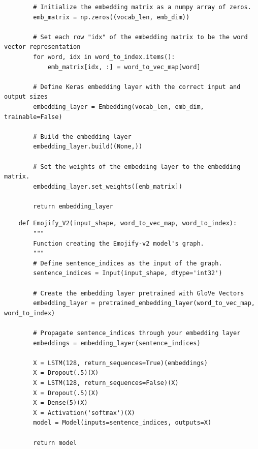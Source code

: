 \documentclass[11pt, a4paper]{article}
\begin{document}
\begin{spacing}{1.1}
\begin{lstlisting}
		# Initialize the embedding matrix as a numpy array of zeros.
		emb_matrix = np.zeros((vocab_len, emb_dim))
		
		# Set each row "idx" of the embedding matrix to be the word vector representation
		for word, idx in word_to_index.items():
			emb_matrix[idx, :] = word_to_vec_map[word]
		
		# Define Keras embedding layer with the correct input and output sizes
		embedding_layer = Embedding(vocab_len, emb_dim, trainable=False)
		
		# Build the embedding layer
		embedding_layer.build((None,))
		
		# Set the weights of the embedding layer to the embedding matrix.
		embedding_layer.set_weights([emb_matrix])
		
		return embedding_layer	\end{lstlisting} \vspace*{1mm}
		
	\begin{lstlisting}
	def Emojify_V2(input_shape, word_to_vec_map, word_to_index):
		"""
		Function creating the Emojify-v2 model's graph.
		"""
		# Define sentence_indices as the input of the graph.
		sentence_indices = Input(input_shape, dtype='int32')
		
		# Create the embedding layer pretrained with GloVe Vectors
		embedding_layer = pretrained_embedding_layer(word_to_vec_map, word_to_index)
		
		# Propagate sentence_indices through your embedding layer
		embeddings = embedding_layer(sentence_indices)   
		
		X = LSTM(128, return_sequences=True)(embeddings)
		X = Dropout(.5)(X)
		X = LSTM(128, return_sequences=False)(X)
		X = Dropout(.5)(X)
		X = Dense(5)(X)
		X = Activation('softmax')(X)
		model = Model(inputs=sentence_indices, outputs=X)
		
		return model \end{lstlisting} \newpage


\end{spacing}
\end{document}
